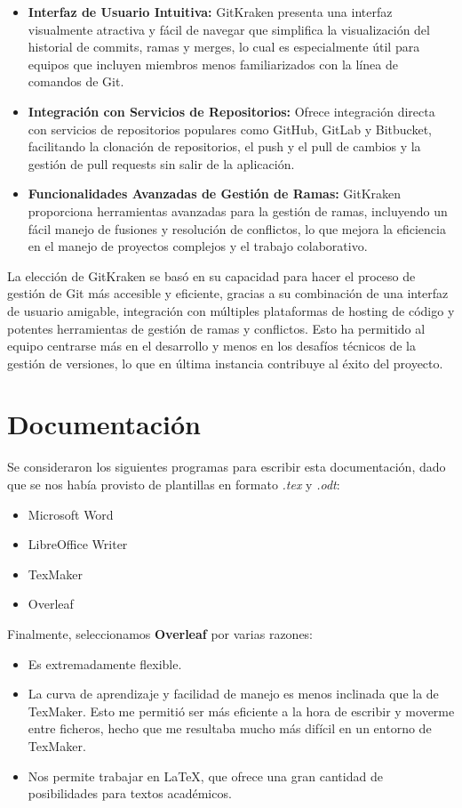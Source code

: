\begin{itemize}
    \item \textbf{Interfaz de Usuario Intuitiva:} GitKraken presenta una interfaz visualmente atractiva y fácil de navegar que simplifica la visualización del historial de commits, ramas y merges, lo cual es especialmente útil para equipos que incluyen miembros menos familiarizados con la línea de comandos de Git.
    \item \textbf{Integración con Servicios de Repositorios:} Ofrece integración directa con servicios de repositorios populares como GitHub, GitLab y Bitbucket, facilitando la clonación de repositorios, el push y el pull de cambios y la gestión de pull requests sin salir de la aplicación.
    \item \textbf{Funcionalidades Avanzadas de Gestión de Ramas:} GitKraken proporciona herramientas avanzadas para la gestión de ramas, incluyendo un fácil manejo de fusiones y resolución de conflictos, lo que mejora la eficiencia en el manejo de proyectos complejos y el trabajo colaborativo.
\end{itemize}
La elección de GitKraken se basó en su capacidad para hacer el proceso de gestión de Git más accesible y eficiente, gracias a su combinación de una interfaz de usuario amigable, integración con múltiples plataformas de hosting de código y potentes herramientas de gestión de ramas y conflictos. Esto ha permitido al equipo centrarse más en el desarrollo y menos en los desafíos técnicos de la gestión de versiones, lo que en última instancia contribuye al éxito del proyecto.

\section{Documentación}
Se consideraron los siguientes programas para escribir esta documentación, dado que se nos había provisto de plantillas en formato \textit{.tex} y \textit{.odt}:
\begin{itemize}
    \item Microsoft Word
    \item LibreOffice Writer
    \item TexMaker
    \item Overleaf
\end{itemize}

Finalmente, seleccionamos \textbf{Overleaf} por varias razones:
\begin{itemize}
    \item Es extremadamente flexible.
    \item La curva de aprendizaje y facilidad de manejo es menos inclinada que la de TexMaker. Esto me permitió ser más eficiente a la hora de escribir y moverme entre ficheros, hecho que me resultaba mucho más difícil en un entorno de TexMaker.
    \item Nos permite trabajar en LaTeX, que ofrece una gran cantidad de posibilidades para textos académicos.
\end{itemize}